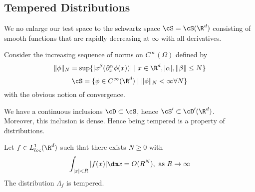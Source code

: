 \subsection{Tempered Distributions}
We no enlarge our test space to the schwartz space $\cS = \cS(\R^d)$ consisting of smooth functions that are rapidly decreasing at $\infty$ with all derivatives.
\begin{definition}
	Consider the increasing sequence of norms on $C^\infty(\Omega)$ defined by
	\[
	\|\phi\|_N = \sup \{ | x^\beta (\partial_x^\alpha \phi(x)) | \mid x \in \R^d , |\alpha|,\|\beta\|\le N\}
	\]
	\[
	\cS = \{\phi \in C^\infty(\R^d) \mid \|\phi\|_N < \infty \forall N\}
	\]
	with the obvious notion of convergence.
\end{definition}
\begin{lemma}
	We have a continuous inclusions $\cD \subset \cS$, hence $\cS' \subset \cD'(\R^d)$. \\
	Moreover, this inclusion is dense. Hence being tempered is a property of distributions. %
\end{lemma}
\begin{lemma}{\label{lemma:slowlyInc}}
	Let $f \in L^1_{loc}(\R^d)$ such that there exists $N \ge 0$ with
	\[
	\int_{|x| < R} |f(x)| \dm x = O(R^N) , \text{ as } R \to \infty
	\]
	The distribution $\Lambda_f$ is tempered.
\end{lemma}

